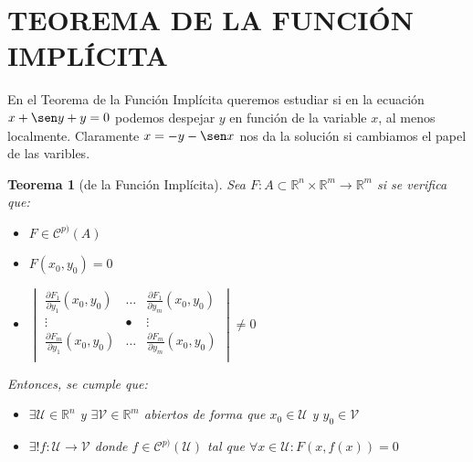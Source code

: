 \documentclass[10pt,a4paper,openright]{book}
\theoremstyle{break}
\newtheorem*{theo}{Teorema}
\begin{document}
\section*{TEOREMA DE LA FUNCIÓN IMPLÍCITA}
En el Teorema de la Función Implícita queremos estudiar si en la ecuación $x  + \sen y + y = 0$ podemos despejar $y$ en función de la variable $x$, al menos localmente. Claramente $x = -y - \sen x$ nos da la solución si cambiamos el papel de las varibles.

\begin{theo}[de la Función Implícita]
Sea $F: A \subset \mathbb{R}^n \times \mathbb{R}^m \to \mathbb{R}^m$ si se verifica que:
\begin{itemize}
\item $F \in \mathcal{C}^{p)}(A)$
\item $F(x_0, y_0) = 0$
\item $\begin{vmatrix} \frac{\partial F_1}{\partial y_1} (x_0, y_0) & \ldots & \frac{\partial F_1}{\partial y_m} (x_0, y_0) \\ \vdots & • & \vdots \\ \frac{\partial F_m}{\partial y_1} (x_0, y_0) & \ldots & \frac{\partial F_m}{\partial y_m} (x_0, y_0) \\ \end{vmatrix} \neq 0$
\end{itemize}
Entonces, se cumple que:
\begin{itemize}
\item $\exists \mathcal{U}\in \mathbb{R}^n$ y $\exists \mathcal{V} \in \mathbb{R}^m$ abiertos de forma que $x_0 \in \mathcal{U}$ y $y_0\in \mathcal{V}$
\item $\exists ! f: \mathcal{U} \to \mathcal{V}$ donde $f \in \mathcal{C}^{p)} (\mathcal{U})$ tal que $\forall x \in \mathcal{U} : F(x, f(x)) = 0$
\end{itemize}
\end{theo}
\end{document}
